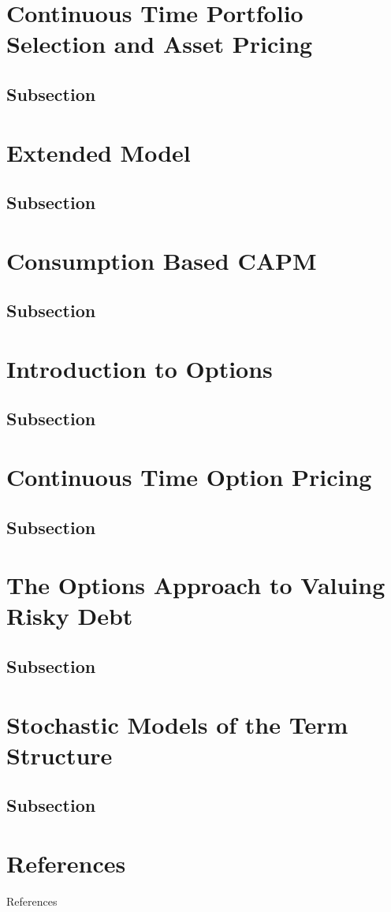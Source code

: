 \documentclass[
14pt,notheorems,hyperref={pdfauthor=whatever}
]{beamer}
\begin{document}
\section{Continuous Time Portfolio Selection and Asset Pricing}
\subsection{Subsection}

\section{Extended Model}
\subsection{Subsection}

\section{Consumption Based CAPM}
\subsection{Subsection}

\section{Introduction to Options}
\subsection{Subsection}

\section{Continuous Time Option Pricing}
\subsection{Subsection}

\section{The Options Approach to Valuing Risky Debt}
\subsection{Subsection}

\section{Stochastic Models of the Term Structure}
\subsection{Subsection}

\section*{References}
\begin{frame}[allowframebreaks]{References}
    \printbibliography
\end{frame}
\end{document}
